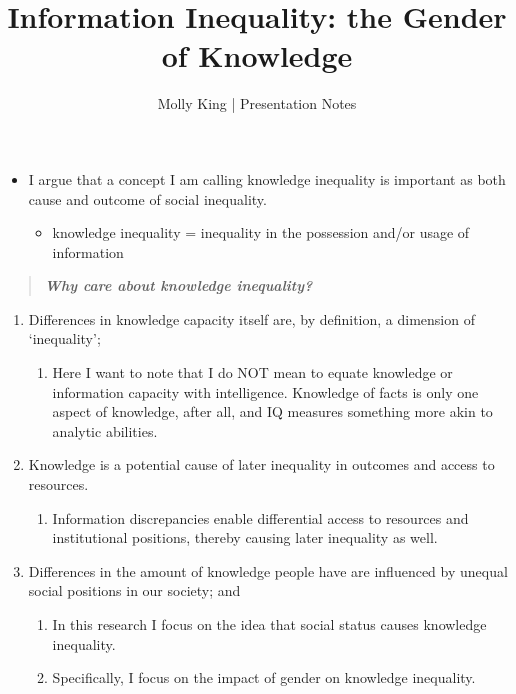 \documentclass[]{article}
\begin{document}
 \title{\vspace{-1.0cm}Information Inequality: the Gender of Knowledge}
 \date{}
 \author{Molly King  |  Presentation Notes}

 \maketitle

\begin{itemize}
  \item{I argue that a concept I am calling knowledge inequality is important as both cause and outcome of social inequality.}
    \begin{itemize}
      \item{knowledge inequality = inequality in the possession and/or usage of information}
    \end{itemize}
\end{itemize}



\begin{quote}
  \emph{\textbf{Why care about knowledge inequality?}}
\end{quote}




\begin{enumerate}
  \item{Differences in knowledge capacity itself are, by definition, a dimension of `inequality';}
    \begin{enumerate}
      \item{Here I want to note that I do NOT mean to equate knowledge or information capacity with intelligence. Knowledge of facts is only one aspect of knowledge, after all, and IQ measures something more akin to analytic abilities.}
    \end{enumerate}

  \item{Knowledge is a potential cause of later inequality in outcomes and access to resources.}
    \begin{enumerate}
      \item{Information discrepancies enable differential access to resources and institutional positions, thereby causing later inequality as well.}
    \end{enumerate}

  \item{Differences in the amount of knowledge people have are influenced by unequal social positions in our society; and}
    \begin{enumerate}
      \item{In this research I focus on the idea that social status causes knowledge inequality.}
      \item{Specifically, I focus on the impact of gender on knowledge inequality.}
    \end{enumerate}
\end{enumerate}
\end{document}
